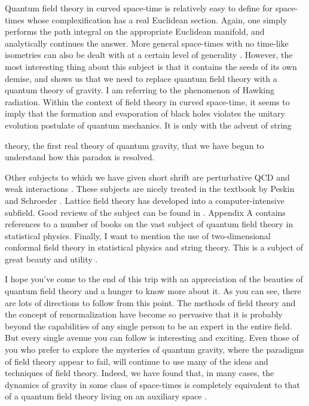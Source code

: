 Quantum field theory in curved space-time is relatively easy to define for space-times
whose complexification has a real Euclidean section. Again, one simply performs the
path integral on the appropriate Euclidean manifold, and analytically continues the
answer. More general space-times with no time-like isometries can also be dealt with
at a certain level of generality \cite{banks-ref-159}. However, the most interesting thing about this
subject is that it contains the seeds of its own demise, and shows us that we need to
replace quantum field theory with a quantum theory of gravity. I am referring to the
phenomenon of Hawking radiation. Within the context of field theory in curved space-time,
it seems to imply that the formation and evaporation of black holes violates the
unitary evolution postulate of quantum mechanics. It is only with the advent of string

theory, the first real theory of quantum gravity, that we have begun to understand how
this paradox is resolved.


Other subjects to which we have given short shrift are perturbative QCD \cite{banks-ref-124}
and weak interactions \cite{banks-ref-160,banks-ref-161}. These subjects are nicely treated in the textbook by
Peskin and Schroeder \cite{banks-ref-33}. Lattice field theory has developed into a computer-intensive
subfield. Good reviews of the subject can be found in \cite{banks-ref-162}. Appendix A contains references
to a number of books on the vast subject of quantum field theory in statistical
physics. Finally, I want to mention the use of two-dimensional conformal field theory
in statistical physics and string theory. This is a subject of great beauty and utility
\cite{banks-ref-163,banks-ref-164}.

I hope you've come to the end of this trip with an appreciation of the beauties of
quantum field theory and a hunger to know more about it. As you can see, there are
lots of directions to follow from this point. The methods of field theory and the concept
of renormalization have become so pervasive that it is probably beyond the capabilities
of any single person to be an expert in the entire field. But every single avenue you
can follow is interesting and exciting. Even those of you who prefer to explore the
mysteries of quantum gravity, where the paradigms of field theory appear to fail, will
continue to use many of the ideas and techniques of field theory. Indeed, we have found
that, in many cases, the dynamics of gravity in some class of space-times is completely
equivalent to that of a quantum field theory living on an auxiliary space
\cite{banks-ref-165,banks-ref-166,banks-ref-167}.
